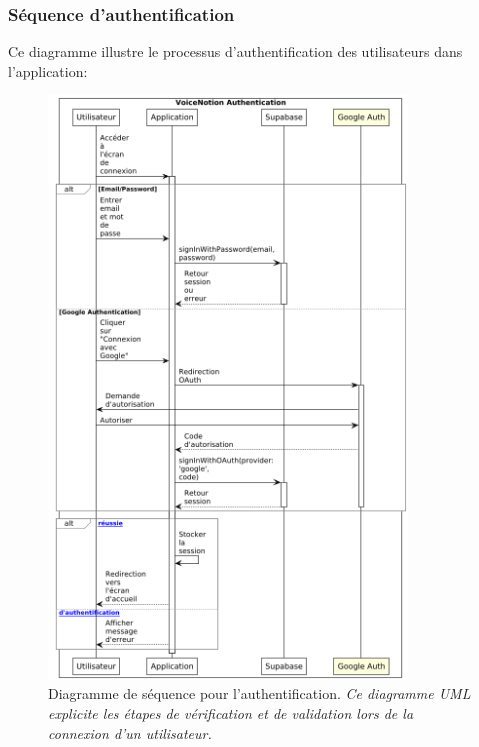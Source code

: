     \subsubsection{Séquence d'authentification}
    
    Ce diagramme illustre le processus d'authentification des utilisateurs dans l'application:
    
        \begin{figure}[htbp]
        \centering
        \includegraphics[width=0.85\textwidth]{assets/docs/SayNote_auth_sequence.png}
        \caption{Diagramme de séquence pour l'authentification. \newline\textit{Ce diagramme UML explicite les étapes de vérification et de validation lors de la connexion d'un utilisateur.}}
        \label{fig:sequence_auth}
    \end{figure}
    
